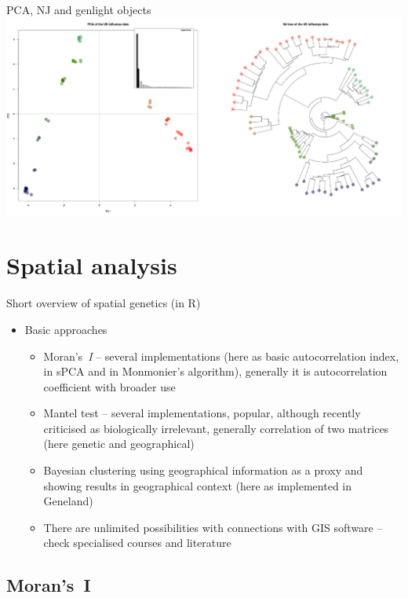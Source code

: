 \documentclass[compress, ucs, xelatex, 11pt, xcolor=svgnames,
  hyperref={
    bookmarks=true,
    unicode=true,
    colorlinks=true,
    pdftitle={Molecular data in R},
    plainpages=false,
    pdfauthor={Vojtech Zeisek},
    pdfsubject={Course about phylogeny and evolution in R},
    pdfcreator={XeLaTeX},
    pdfkeywords={R, evolution, phylogeny, molecular data},
    linkcolor=Tomato,
    anchorcolor=SaddleBrown,
    citecolor=Goldenrod,
    filecolor=DarkMagenta,
    menucolor=Sienna,
    urlcolor=DarkTurquoise,
    pdftex},
  url={hyphens, lowtilde} %
  ]{beamer}
\begin{document}
\begin{frame}{PCA, NJ and genlight objects}
\includegraphics[width=\textwidth]{flu_pcoa_nj.png}
\end{frame}

\section{Spatial analysis}

\begin{frame}{Short overview of spatial genetics (in R)}
\begin{itemize}
  \item Basic approaches
  \begin{itemize}
    \item Moran's~\textit{I} -- several implementations (here as basic autocorrelation index, in sPCA and in Monmonier's algorithm), generally it is autocorrelation coefficient with broader use
    \item Mantel test -- several implementations, popular, although recently criticised as biologically irrelevant, generally correlation of two matrices (here genetic and geographical)
    \item Bayesian clustering using geographical information as a proxy and showing results in geographical context (here as implemented in Geneland)
    \item There are unlimited possibilities with connections with GIS software -- check specialised courses and literature
  \end{itemize}
\end{itemize}
\end{frame}

\subsection{Moran's~I}
\end{document}
